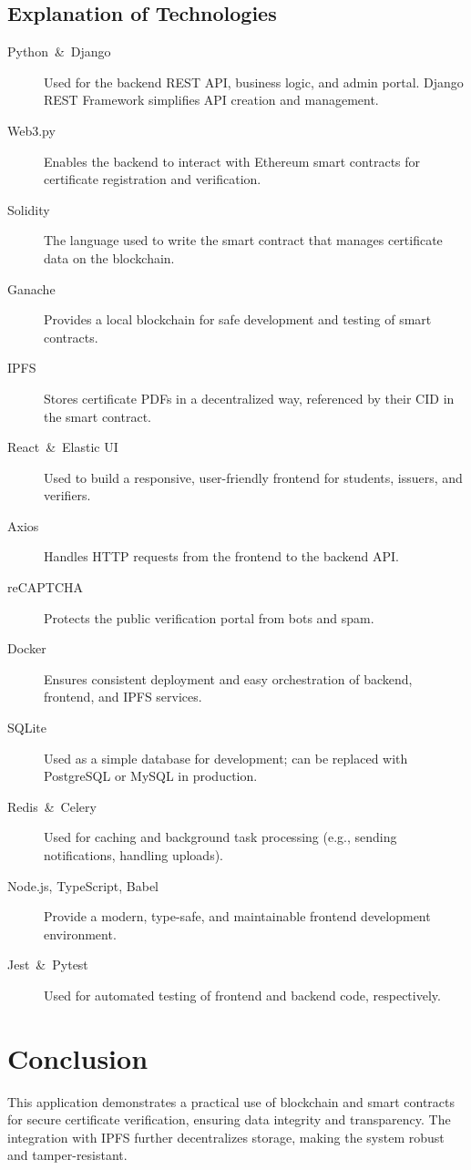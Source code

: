 \documentclass{article}
\begin{document}
\subsection{Explanation of Technologies}
\begin{description}
    \item[Python \,\&\, Django] Used for the backend REST API, business logic, and admin portal. Django REST Framework simplifies API creation and management.
    \item[Web3.py] Enables the backend to interact with Ethereum smart contracts for certificate registration and verification.
    \item[Solidity] The language used to write the smart contract that manages certificate data on the blockchain.
    \item[Ganache] Provides a local blockchain for safe development and testing of smart contracts.
    \item[IPFS] Stores certificate PDFs in a decentralized way, referenced by their CID in the smart contract.
    \item[React \,\&\, Elastic UI] Used to build a responsive, user-friendly frontend for students, issuers, and verifiers.
    \item[Axios] Handles HTTP requests from the frontend to the backend API.
    \item[reCAPTCHA] Protects the public verification portal from bots and spam.
    \item[Docker] Ensures consistent deployment and easy orchestration of backend, frontend, and IPFS services.
    \item[SQLite] Used as a simple database for development; can be replaced with PostgreSQL or MySQL in production.
    \item[Redis \,\&\, Celery] Used for caching and background task processing (e.g., sending notifications, handling uploads).
    \item[Node.js, TypeScript, Babel] Provide a modern, type-safe, and maintainable frontend development environment.
    \item[Jest \,\&\, Pytest] Used for automated testing of frontend and backend code, respectively.
\end{description}

\section{Conclusion}
This application demonstrates a practical use of blockchain and smart contracts for secure certificate verification, ensuring data integrity and transparency. The integration with IPFS further decentralizes storage, making the system robust and tamper-resistant.
\end{document}
